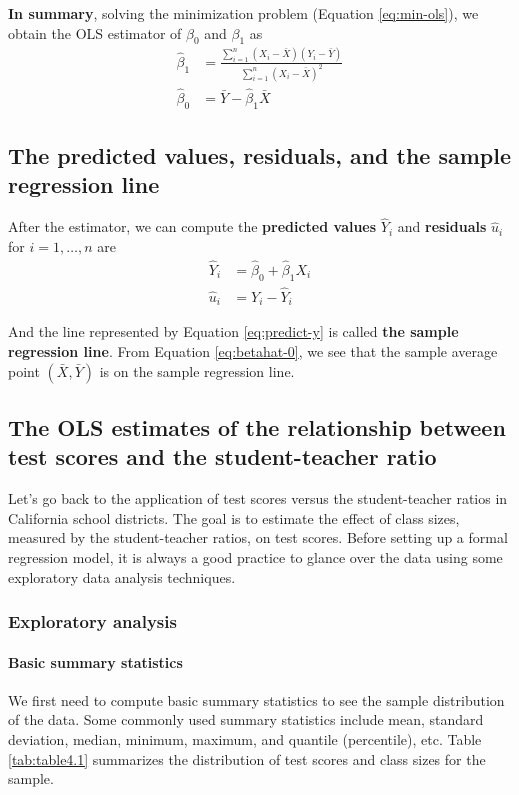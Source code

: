 \documentclass[a4paper,11pt]{article}
\begin{document}
\textbf{In summary}, solving the minimization problem (Equation
\ref{eq:min-ols}), we obtain the OLS estimator of \(\beta_0\) and
\(\beta_1\) as
\begin{align}
\hat{\beta}_1 & = \frac{\sum_{i=1}^n (X_i - \bar{X})(Y_i - \bar{Y})}{\sum_{i=1}^n (X_i - \bar{X})^2}  \label{eq:betahat-1} \\
\hat{\beta}_0 & = \bar{Y} - \hat{\beta}_1 \bar{X}  \label{eq:betahat-0}
\end{align}

\subsection{The predicted values, residuals, and the sample regression line}
\label{sec:org0140dee}

After the estimator, we can compute the \textbf{predicted values} \(\hat{Y}_i\) and \textbf{residuals} \(\hat{u}_i\) for \(i = 1,
\ldots, n\) are
\begin{align}
\hat{Y}_i & = \hat{\beta}_0 + \hat{\beta}_1 X_i \label{eq:predict-y} \\
\hat{u}_i & = Y_i - \hat{Y}_i \label{eq:residual}
\end{align}

And the line represented by Equation \ref{eq:predict-y} is called \textbf{the
sample regression line}. From Equation \ref{eq:betahat-0}, we see that the sample average
point \((\bar{X}, \bar{Y})\) is on the sample regression line.

\subsection{The OLS estimates of the relationship between test scores and the student-teacher ratio}
\label{sec:orgacec8bd}
Let's go back to the application of test scores versus the
student-teacher ratios in California school districts. The goal is to
estimate the effect of class sizes, measured by the student-teacher
ratios, on test scores. Before setting up a formal regression model,
it is always a good practice to glance over the data using some
exploratory data analysis techniques.

\subsubsection*{Exploratory analysis}
\label{sec:orga6a6526}
\paragraph*{Basic summary statistics}
\label{sec:org46ec9aa}
We first need to compute basic summary statistics to see the sample
distribution of the data. Some commonly used summary statistics
include mean, standard deviation, median, minimum, maximum, and
quantile (percentile), etc. Table \ref{tab:table4.1} summarizes the
distribution of test scores and class sizes for the sample.
\end{document}
